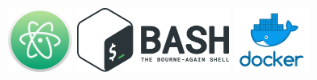 \begin{figure}[t]
  \centering
  \newcommand{\developmentToolsLogosHeight}{1.7cm}
  \includegraphics[height=\developmentToolsLogosHeight]{assets/tools/development/atom.png}
  \includegraphics[height=\developmentToolsLogosHeight]{assets/tools/development/bash.png}
  \includegraphics[height=\developmentToolsLogosHeight]{assets/tools/development/docker.png}

\end{figure}
